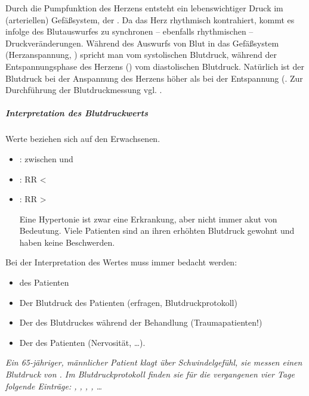 % 
% 

{\label{topic:blutdruck}%
Durch die Pumpfunktion des Herzens
entsteht ein lebenswichtiger Druck im 
(arteriellen) Gefäßsystem, der
.
Da das Herz rhythmisch kontrahiert, kommt es infolge des
Blutauswurfes zu synchronen -- ebenfalls rhythmischen --
Druckveränderungen. Während des Auswurfs von Blut in das
Gefäßsystem (Herzanspannung, ) spricht man vom
systolischen Blutdruck, während der Entspannungsphase des
Herzens () vom diastolischen Blutdruck.
Natürlich ist der Blutdruck bei der Anspannung des Herzens
höher als bei der Entspannung (. Zur Durchführung der
Blutdruckmessung vgl.
.

\subparagraph{{Interpretation des Blutdruckwerts}}
{\tiny Werte beziehen sich auf den Erwachsenen.}
\begin{itemize}
    \item {}: zwischen  und
     
    \item {}: RR {\textless}~
    \item {}: RR
    {\textgreater}~
    
    Eine Hypertonie ist zwar eine Erkrankung, aber
nicht immer akut von Bedeutung. Viele Patienten sind
an ihren erhöhten Blutdruck gewohnt und haben keine
Beschwerden.
\end{itemize}
Bei der Interpretation des Wertes muss immer bedacht
werden:
\begin{itemize}
    \item {} des Patienten
    \item Der  Blutdruck des Patienten
    (erfragen, Blutdruckprotokoll)
    \item Der  des Blutdruckes während der
    Behandlung (Traumapatienten!)
    \item Der  des Patienten (Nervosität, \ldots).
\end{itemize}


\emph{Ein 65-jähriger, männlicher Patient klagt über
Schwindelgefühl, sie messen einen Blutdruck von
. Im Blutdruckprotokoll finden sie für die
vergangenen vier Tage folgende Einträge:
, , , , \ldots}


}
